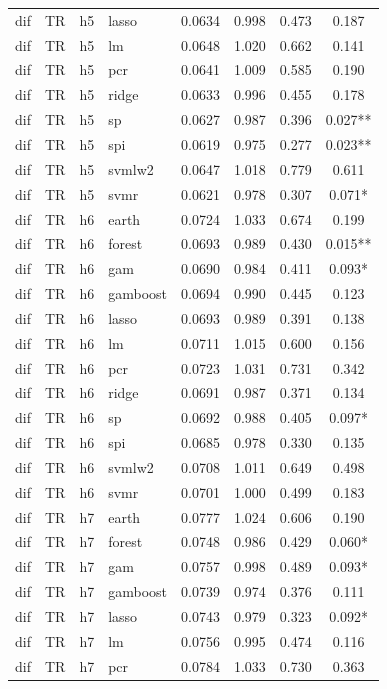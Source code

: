 \begin{ThreePartTable}
\begin{longtable}[t]{llclcccc}
dif & TR & h5 & lasso & 0.0634 & 0.998 & 0.473 & 0.187\\
dif & TR & h5 & lm & 0.0648 & 1.020 & 0.662 & 0.141\\
dif & TR & h5 & pcr & 0.0641 & 1.009 & 0.585 & 0.190\\
dif & TR & h5 & ridge & 0.0633 & 0.996 & 0.455 & 0.178\\
dif & TR & h5 & sp & 0.0627 & 0.987 & 0.396 & 0.027**\\
dif & TR & h5 & spi & 0.0619 & 0.975 & 0.277 & 0.023**\\
dif & TR & h5 & svmlw2 & 0.0647 & 1.018 & 0.779 & 0.611\\
dif & TR & h5 & svmr & 0.0621 & 0.978 & 0.307 & 0.071*\\
\addlinespace
dif & TR & h6 & earth & 0.0724 & 1.033 & 0.674 & 0.199\\
dif & TR & h6 & forest & 0.0693 & 0.989 & 0.430 & 0.015**\\
dif & TR & h6 & gam & 0.0690 & 0.984 & 0.411 & 0.093*\\
dif & TR & h6 & gamboost & 0.0694 & 0.990 & 0.445 & 0.123\\
dif & TR & h6 & lasso & 0.0693 & 0.989 & 0.391 & 0.138\\
dif & TR & h6 & lm & 0.0711 & 1.015 & 0.600 & 0.156\\
dif & TR & h6 & pcr & 0.0723 & 1.031 & 0.731 & 0.342\\
dif & TR & h6 & ridge & 0.0691 & 0.987 & 0.371 & 0.134\\
dif & TR & h6 & sp & 0.0692 & 0.988 & 0.405 & 0.097*\\
dif & TR & h6 & spi & 0.0685 & 0.978 & 0.330 & 0.135\\
dif & TR & h6 & svmlw2 & 0.0708 & 1.011 & 0.649 & 0.498\\
dif & TR & h6 & svmr & 0.0701 & 1.000 & 0.499 & 0.183\\
\addlinespace
dif & TR & h7 & earth & 0.0777 & 1.024 & 0.606 & 0.190\\
dif & TR & h7 & forest & 0.0748 & 0.986 & 0.429 & 0.060*\\
dif & TR & h7 & gam & 0.0757 & 0.998 & 0.489 & 0.093*\\
dif & TR & h7 & gamboost & 0.0739 & 0.974 & 0.376 & 0.111\\
dif & TR & h7 & lasso & 0.0743 & 0.979 & 0.323 & 0.092*\\
dif & TR & h7 & lm & 0.0756 & 0.995 & 0.474 & 0.116\\
dif & TR & h7 & pcr & 0.0784 & 1.033 & 0.730 & 0.363\\

\end{longtable}
\end{ThreePartTable}
